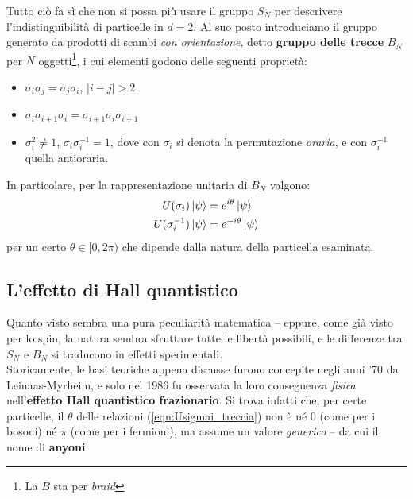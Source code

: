 \documentclass[../../FisicaTeorica.tex]{subfiles}
\begin{document}
Tutto ciò fa sì che non si possa più usare il gruppo $S_N$ per descrivere l'indistinguibilità di particelle in $d=2$. Al suo posto introduciamo il gruppo generato da prodotti di scambi \textit{con orientazione}, detto \textbf{gruppo delle trecce} $B_N$ per $N$ oggetti\footnote{La $B$ sta per \textit{braid}}, i cui elementi godono delle seguenti proprietà:
\begin{itemize}
\item $\sigma_i \sigma_j = \sigma_j \sigma_i$, $|i-j|>2$
\item $\sigma_i \sigma_{i+1}\sigma_i = \sigma_{i+1}\sigma_i\sigma_{i+1}$
\item $\sigma_i^2 \neq 1$, $\sigma_i \sigma_i^{-1} = 1$, dove con $\sigma_i$ si denota la permutazione \textit{oraria}, e con $\sigma_i^{-1}$ quella antioraria.
\end{itemize}
In particolare, per la rappresentazione unitaria di $B_N$ valgono:
\begin{align}
\label{eqn:Usigmai_treccia}
U(\sigma_i) \Ket{\psi} &= e^{i\theta} \Ket{\psi}\\
U(\sigma_i^{-1}) \Ket{\psi} &= e^{-i\theta}\Ket{\psi} \nonumber
\end{align}
per un certo $\theta \in [0,2\pi)$ che dipende dalla natura della particella esaminata.\\

\subsection{L'effetto di Hall quantistico}
Quanto visto sembra una pura peculiarità matematica -- eppure, come già visto per lo spin, la natura sembra sfruttare tutte le libertà possibili, e le differenze tra $S_N$ e $B_N$ si traducono in effetti sperimentali.\\
Storicamente, le basi teoriche appena discusse furono concepite negli anni '70 da Leinaas-Myrheim, e solo nel 1986 fu osservata la loro conseguenza \textit{fisica} nell'\textbf{effetto Hall quantistico frazionario}. Si trova infatti che, per certe particelle, il $\theta$ delle relazioni (\ref{eqn:Usigmai_treccia}) non è né $0$ (come per i bosoni) né $\pi$ (come per i fermioni), ma assume un valore \textit{generico} -- da cui il nome di \textbf{anyoni}.\\
\end{document}
